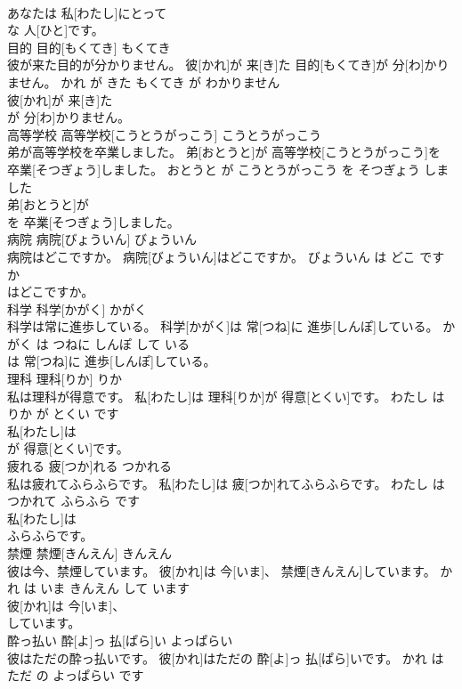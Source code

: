 \documentclass[8pt]{extreport}
\begin{document}
\begin{CJK}{UTF8}{min}
\\	あなたは 私[わたし]にとって
\\	な 人[ひと]です。			
\\	目的	目的[もくてき]	もくてき	
\\	彼が来た目的が分かりません。	彼[かれ]が 来[き]た 目的[もくてき]が 分[わ]かりません。	かれ が きた もくてき が わかりません	
\\	彼[かれ]が 来[き]た
\\	が 分[わ]かりません。			
\\	高等学校	高等学校[こうとうがっこう]	こうとうがっこう	
\\	弟が高等学校を卒業しました。	弟[おとうと]が 高等学校[こうとうがっこう]を 卒業[そつぎょう]しました。	おとうと が こうとうがっこう を そつぎょう しました	
\\	弟[おとうと]が
\\	を 卒業[そつぎょう]しました。			
\\	病院	病院[びょういん]	びょういん	
\\	病院はどこですか。	病院[びょういん]はどこですか。	びょういん は どこ です か	
\\	はどこですか。			
\\	科学	科学[かがく]	かがく	
\\	科学は常に進歩している。	科学[かがく]は 常[つね]に 進歩[しんぽ]している。	かがく は つねに しんぽ して いる	
\\	は 常[つね]に 進歩[しんぽ]している。			
\\	理科	理科[りか]	りか	
\\	私は理科が得意です。	私[わたし]は 理科[りか]が 得意[とくい]です。	わたし は りか が とくい です	
\\	私[わたし]は
\\	が 得意[とくい]です。			
\\	疲れる	疲[つか]れる	つかれる	
\\	私は疲れてふらふらです。	私[わたし]は 疲[つか]れてふらふらです。	わたし は つかれて ふらふら です	
\\	私[わたし]は
\\	ふらふらです。			
\\	禁煙	禁煙[きんえん]	きんえん	
\\	彼は今、禁煙しています。	彼[かれ]は 今[いま]、 禁煙[きんえん]しています。	かれ は いま きんえん して います	
\\	彼[かれ]は 今[いま]、
\\	しています。			
\\	酔っ払い	酔[よ]っ 払[ぱら]い	よっぱらい	
\\	彼はただの酔っ払いです。	彼[かれ]はただの 酔[よ]っ 払[ぱら]いです。	かれ は ただ の よっぱらい です	

\end{CJK}
\end{document}
